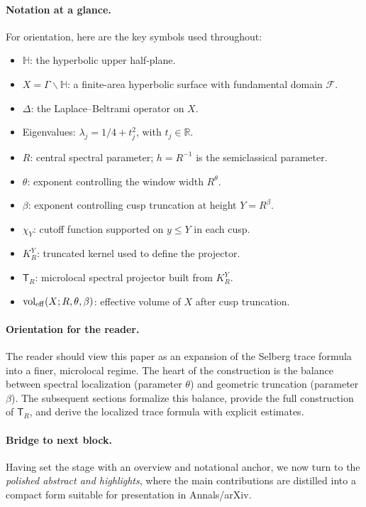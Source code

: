 \paragraph{Notation at a glance.}
For orientation, here are the key symbols used throughout:
\begin{itemize}
  \item $\mathbb{H}$: the hyperbolic upper half-plane.
  \item $X=\Gamma\backslash \mathbb{H}$: a finite-area hyperbolic surface with
        fundamental domain $\mathcal{F}$.
  \item $\Delta$: the Laplace--Beltrami operator on $X$.
  \item Eigenvalues: $\lambda_j = 1/4+t_j^2$, with $t_j \in \mathbb{R}$.
  \item $R$: central spectral parameter; $h=R^{-1}$ is the semiclassical parameter.
  \item $\theta$: exponent controlling the window width $R^\theta$.
  \item $\beta$: exponent controlling cusp truncation at height $Y=R^\beta$.
  \item $\chi_Y$: cutoff function supported on $y \leq Y$ in each cusp.
  \item $K_R^Y$: truncated kernel used to define the projector.
  \item $\mathsf{T}_R$: microlocal spectral projector built from $K_R^Y$.
  \item $\operatorname{vol}_{\mathrm{eff}}(X;R,\theta,\beta)$: effective volume of $X$ after cusp
        truncation.
\end{itemize}

\paragraph{Orientation for the reader.}
The reader should view this paper as an expansion of the Selberg trace formula into a
finer, microlocal regime. The heart of the construction is the balance between spectral
localization (parameter $\theta$) and geometric truncation (parameter $\beta$).  
The subsequent sections formalize this balance, provide the full construction of
$\mathsf{T}_R$, and derive the localized trace formula with explicit estimates.

\paragraph{Bridge to next block.}
Having set the stage with an overview and notational anchor, we now turn to the
\emph{polished abstract and highlights}, where the main contributions are distilled into a
compact form suitable for presentation in Annals/arXiv.

